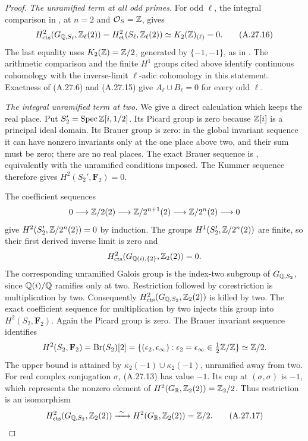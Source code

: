 \begin{proof}
\emph{The unramified term at all odd primes.}
For odd $\ell$, the integral comparison in
\cite[VI, Theorem 8.2]{Weibel2013}, at $n=2$ and
$\mathcal O_S=\mathbb Z$, gives
\[
 H^2_{\mathrm{cts}}(G_{\mathbb Q,S_\ell},\mathbb Z_\ell(2))
   =H^2_{\mathrm{et}}(S_\ell,\mathbb Z_\ell(2))
   \simeq K_2(\mathbb Z)_{(\ell)}=0.
 \tag{A.27.16}
\]
The last equality uses $K_2(\mathbb Z)=\mathbb Z/2$, generated by
$\{-1,-1\}$, as in
\cite[III, Example 5.2.2]{Weibel2013}.
The arithmetic comparison and the finite $H^1$ groups
cited above identify continuous cohomology with the
inverse-limit \ensuremath{\ell}-adic cohomology in this
statement. Exactness of (A.27.6) and (A.27.15) give
$A_\ell\cup B_\ell=0$ for every odd $\ell$.

\emph{The integral unramified term at two.}
We give a direct calculation which keeps the real place.
Put $S_2'=\operatorname{Spec}\mathbb Z[i,1/2]$.
Its Picard group is zero because $\mathbb Z[i]$ is a principal
ideal domain. Its Brauer group is zero: in the global
invariant sequence it can have nonzero invariants only
at the one place above two, and their sum must be zero;
there are no real places. The exact Brauer sequence is
\cite[II, Proposition 2.1]{BIR_MilneADT}, equivalently
\cite[VIII, Theorem 4.2]{MilneCFT} with the unramified
conditions imposed. The Kummer sequence therefore gives
$H^2(S_2',\mathbf F_2)=0$.

The coefficient sequences
\[
0\longrightarrow\mathbb Z/2(2)\longrightarrow\mathbb Z/2^{n+1}(2)
 \longrightarrow\mathbb Z/2^n(2)\longrightarrow0
\]
give $H^2(S_2',\mathbb Z/2^n(2))=0$ by induction. The groups
$H^1(S_2',\mathbb Z/2^n(2))$ are finite, so their first derived
inverse limit is zero and
\[
 H^2_{\mathrm{cts}}(G_{\mathbb Q(i),\{2\}},\mathbb Z_2(2))=0.
\]
The corresponding unramified Galois group is the
index-two subgroup of $G_{\mathbb Q,S_2}$, since $\mathbb Q(i)/\mathbb Q$
ramifies only at two. Restriction followed by
corestriction is multiplication by two. Consequently
$H^2_{\mathrm{cts}}(G_{\mathbb Q,S_2},\mathbb Z_2(2))$ is killed by two.
The exact coefficient sequence for multiplication by two
injects this group into $H^2(S_2,\mathbf F_2)$.
Again the Picard group is zero. The Brauer invariant
sequence identifies
\[
 H^2(S_2,\mathbf F_2)=\operatorname{Br}(S_2)[2]
   =\{(\epsilon_2,\epsilon_\infty):
       \epsilon_2=\epsilon_\infty\in\tfrac12\mathbb Z/\mathbb Z\}
   \simeq\mathbb Z/2.
\]
The upper bound is attained by
$\kappa_2(-1)\cup\kappa_2(-1)$, unramified away from two.
For real complex conjugation $\sigma$, (A.27.13) has value
$-1$. Its cup at $(\sigma,\sigma)$ is $-1$, which represents
the nonzero element of
$H^2(G_\mathbb R,\mathbb Z_2(2))=\mathbb Z_2/2$.
Thus restriction is an isomorphism
\[
 H^2_{\mathrm{cts}}(G_{\mathbb Q,S_2},\mathbb Z_2(2))
        \xrightarrow{\ \sim\ }H^2(G_\mathbb R,\mathbb Z_2(2))=\mathbb Z/2.
 \tag{A.27.17}
\]


\end{proof}

